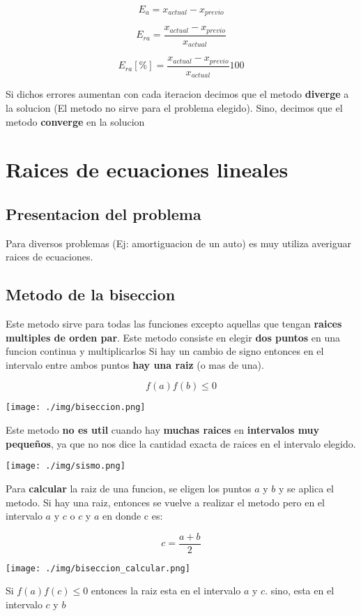 \documentclass[10pt]{article}
\begin{document}
\begin{equation}
	E_a = x_{actual} - x_{previo}
\end{equation}

\begin{equation}
	E_{ra} = \dfrac{x_{actual} - x_{previo}}{x_{actual}}
\end{equation}

\begin{equation}
	E_{ra}[\%] = \dfrac{x_{actual} - x_{previo}}{x_{actual}}100
\end{equation}

Si dichos errores aumentan con cada iteracion decimos que el metodo 
\textbf{diverge} a la solucion (El metodo no sirve para el problema elegido).
Sino, decimos que el metodo \textbf{converge} en la solucion

\pagebreak

\section{Raices de ecuaciones lineales}

\subsection{Presentacion del problema}

Para diversos problemas (Ej: amortiguacion de un auto) es muy utiliza
averiguar raices de ecuaciones.

\subsection{Metodo de la biseccion}

Este metodo sirve para todas las funciones excepto aquellas que tengan
\textbf{raices multiples de orden par}. Este metodo consiste en elegir 
\textbf{dos puntos} en una funcion continua y multiplicarlos Si hay un 
cambio de signo entonces en el intervalo entre ambos puntos 
\textbf{hay una raiz} (o mas de una).

\begin{equation}
	f(a)f(b) \leq 0
\end{equation}

\texttt{[image: ./img/biseccion.png]}

Este metodo \textbf{no es util} cuando hay \textbf{muchas raices} 
en \textbf{intervalos muy pequeños}, ya que no nos dice la 
cantidad exacta de raices en el intervalo elegido.

\texttt{[image: ./img/sismo.png]}

Para \textbf{calcular} la raiz de una funcion, se eligen los puntos
$a$ y $b$ y se aplica el metodo. Si hay una raiz, entonces se vuelve
a realizar el metodo pero en el intervalo $a$ y $c$ o $c$ y $a$ en 
donde c es:

\begin{equation}
	c = \dfrac{a+b}{2}
\end{equation}

\texttt{[image: ./img/biseccion\_calcular.png]}

Si $f(a)f(c) \leq 0$ entonces la raiz esta en el intervalo $a$ y 
$c$. sino, esta en el intervalo $c$ y $b$ 
\end{document}
